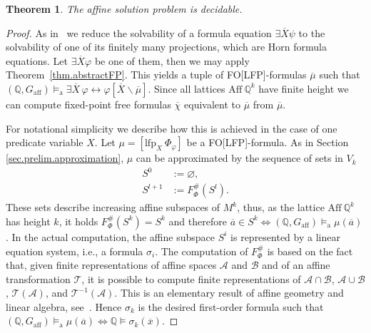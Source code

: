 \documentclass[acmsmall]{acmart}
\theoremstyle{plain}
\newtheorem{theorem}{Theorem}
\theoremstyle{definition}
\newcommand{\calA}{\mathcal{A}}
\newcommand{\calB}{\mathcal{B}}
\newcommand{\calT}{\mathcal{T}}
\newcommand{\mybar}[1]{\overline{#1}}
\newcommand{\Rat}{\mathbb{Q}}
\newcommand{\sop}{[} %
\newcommand{\scl}{]} %
\newcommand{\sel}[2]{#1 \backslash #2} %
\newcommand{\unsubst}[2]{\sop \sel{#1}{#2} \scl} %
\newcommand{\lfp}{\mathrm{lfp}} %
\newcommand{\Aff}{{\mathrm{Aff}~}}
\newcommand{\aff}{{\mathrm{aff}}}
\newcommand{\modelsa}{\models_\mathrm{a}} %
\begin{document}
\begin{theorem}\label{thm.affinesolprob}
	The affine solution problem is decidable.
\end{theorem}
\begin{proof}
	As in~\cite{Hetzl20Decidability} we reduce the solvability of a formula equation $\exists \mybar{X} \psi$ to the
	solvability of one of its finitely many projections, which are Horn formula equations.
	Let $\exists \mybar{X} \varphi$ be one of them, then we may apply Theorem~\ref{thm.abstractFP}. This yields a tuple of FO[LFP]-formulas $\mybar{\mu}$ such that\ 
	$(\Rat,G_{\aff}) \modelsa \exists \mybar{X}\, \varphi \leftrightarrow \varphi\unsubst{\mybar{X}}{\mybar{\mu}}$.
	Since all lattices $\Aff \Rat^k$ have finite height we can compute fixed-point free formulas $\mybar{\chi}$ equivalent to $\mybar{\mu}$ from $\mybar{\mu}$. 
	
	For notational simplicity we describe how this is achieved in the case of one predicate variable $X$. Let $\mu = [\lfp_X~ \Phi_\varphi]$ be a FO[LFP]-formula. As in Section \ref{sec.prelim.approximation}, $\mu$ can be approximated by the sequence of sets in $V_k$
\begin{align*}
	S^0 &:= \varnothing,\\
	S^{l+1} &:= F_{\Phi}^{\#}(S^l).
\end{align*}
These sets describe increasing affine subspaces of $M^k$, thus, as the lattice $\Aff \Rat^k$ has height $k$, it holds $F_{\Phi}^{\#}(S^k) = S^k$ and therefore $\mybar{a} \in S^k \Leftrightarrow (\Rat,G_{\aff}) \modelsa \mu(\mybar{a})$.
In the actual computation, the affine subspace $S^i$ is represented by a linear equation
 system, i.e., a formula $\sigma_i$.
The computation of $F_{\Phi}^{\#}$ is based on the fact that, given finite representations
 of affine spaces $\calA$ and $\calB$ and of an affine transformation
 $\mathcal{T}$, it is possible to compute finite representations of $\calA \cap \calB$,
 $\calA \cup \calB$, $\calT(\calA)$, and $\calT^{-1}(\calA)$.
This is an elementary result of affine geometry and linear algebra,
 see~\cite{Snapper71Metric}.
Hence $\sigma_k$ is the desired first-order formula such that $(\Rat,G_{\aff}) \modelsa \mu(\mybar{a}) \Leftrightarrow \Rat \models \sigma_k(\mybar{x})$.
	

\end{proof}
\end{document}
